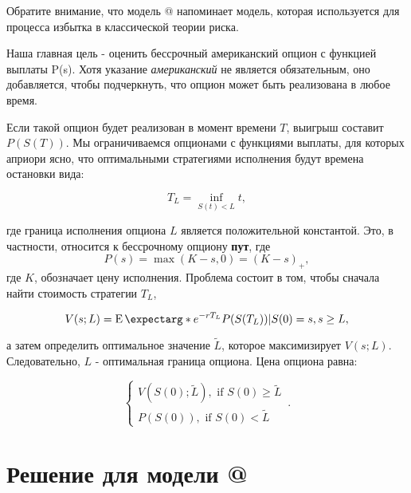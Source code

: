 \documentclass[a4paper,12pt]{article}
\makeatletter
\theoremstyle{definition}
\newcommand*{\rom}[1]{\expandafter\@slowromancap\romannumeral #1@}
\newcommand{\expect}{\operatorname{E}\expectarg}
\makeatother
\begin{document}
Обратите внимание, что модель \rom{2} напоминает модель, которая используется для процесса избытка в классической теории риска.

Наша главная цель - оценить бессрочный американский
опцион с функцией выплаты P(s). Хотя указание \textit{американский} не является обязательным, оно добавляется, чтобы подчеркнуть, что опцион может быть реализована в любое время.

Если такой опцион будет реализован в момент времени $T$, выигрыш составит $P(S(T))$. Мы ограничиваемся опционами с функциями выплаты, для которых априори ясно, что оптимальными стратегиями исполнения будут времена остановки вида:

\begin{equation}\label{eq:optimal_excersize}
T_L = \inf\limits_{S(t) < L}{t},
\end{equation}

где граница исполнения опциона $L$ является положительной константой. Это, в частности, относится к бессрочному опциону \textbf{пут}, где 
\begin{equation}\label{eq:payoff_function}
P(s) = \max(K - s, 0) = (K - s)_+,
\end{equation}
где $K$, обозначает цену исполнения. Проблема состоит в
том, чтобы сначала найти стоимость стратегии $T_L$,

\begin{equation}\label{eq:strategy_cost}
V(s; L) = \expect*{e^{-rT_L} P(S(T_L)) | S(0) = s}, s \ge L,
\end{equation}

а затем определить оптимальное значение $\widetilde{L}$, которое
максимизирует $V(s; L)$. Следовательно, $L$ - оптимальная граница опциона. Цена опциона равна:

\begin{equation}\label{eq:option_price}
    \begin{cases}
      V(S(0); \widetilde{L}), \text{ if } S(0) \ge \widetilde{L}\\
      P(S(0)), \text{ if } S(0) < \widetilde{L}
    \end{cases}\,.
\end{equation}

\section{Решение для модели \rom{1}}
\end{document}
